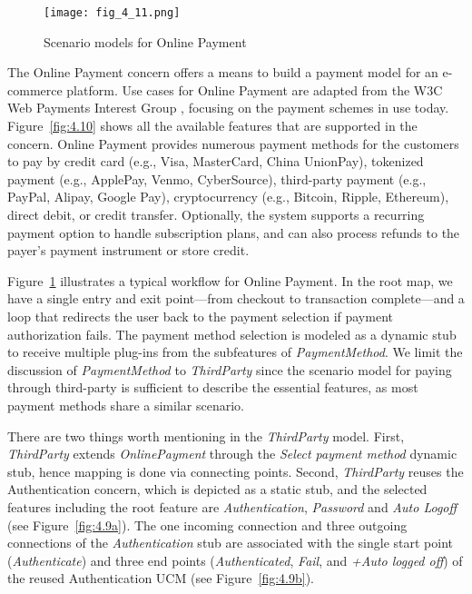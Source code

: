 \begin{figure}
	\centering
	\texttt{[image: fig\_4\_11.png]}
	\caption{Scenario models for Online Payment}
	\label{fig:4.11}
\end{figure}

The Online Payment concern offers a means to build a payment model for an e-commerce platform. Use cases for Online Payment are adapted from the W3C Web Payments Interest Group \cite{w3c2015web}, focusing on the payment schemes in use today. Figure~\ref{fig:4.10} shows all the available features that are supported in the concern. Online Payment provides numerous payment methods for the customers to pay by credit card (e.g., Visa, MasterCard, China UnionPay), tokenized payment (e.g., ApplePay, Venmo, CyberSource), third-party payment (e.g., PayPal, Alipay, Google Pay), cryptocurrency (e.g., Bitcoin, Ripple, Ethereum), direct debit, or credit transfer. Optionally, the system supports a recurring payment option to handle subscription plans, and can also process refunds to the payer's payment instrument or store credit.

Figure~\ref{fig:4.11} illustrates a typical workflow for Online Payment. In the root map, we have a single entry and exit point---from checkout to transaction complete---and a loop that redirects the user back to the payment selection if payment authorization fails. The payment method selection is modeled as a dynamic stub to receive multiple plug-ins from the subfeatures of \emph{PaymentMethod}. We limit the discussion of \emph{PaymentMethod} to \emph{ThirdParty} since the scenario model for paying through third-party is sufficient to describe the essential features, as most payment methods share a similar scenario.

There are two things worth mentioning in the \emph{ThirdParty} model. First, \emph{ThirdParty} extends \emph{OnlinePayment} through the \emph{Select payment method} dynamic stub, hence mapping is done via connecting points. Second, \emph{ThirdParty} reuses the Authentication concern, which is depicted as a static stub, and the selected features including the root feature are \emph{Authentication}, \emph{Password} and \emph{Auto Logoff} (see Figure~\ref{fig:4.9a}). The one incoming connection and three outgoing connections of the \emph{Authentication} stub are associated with the single start point (\emph{Authenticate}) and three end points (\emph{Authenticated}, \emph{Fail}, and \emph{+Auto logged off}) of the reused Authentication UCM (see Figure~\ref{fig:4.9b}).


